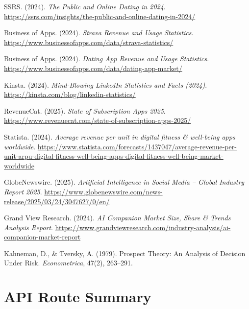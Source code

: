 \documentclass[11pt,a4paper]{article}
\begin{document}
\begin{enumerate}[label={[\arabic*]}, leftmargin=*, itemsep=2pt]
  \item SSRS. (2024). \textit{The Public and Online Dating in 2024}. \url{https://ssrs.com/insights/the-public-and-online-dating-in-2024/}

  \item Business of Apps. (2024). \textit{Strava Revenue and Usage Statistics}. \url{https://www.businessofapps.com/data/strava-statistics/}

  \item Business of Apps. (2024). \textit{Dating App Revenue and Usage Statistics}. \url{https://www.businessofapps.com/data/dating-app-market/}

  \item Kinsta. (2024). \textit{Mind-Blowing LinkedIn Statistics and Facts (2024)}. \url{https://kinsta.com/blog/linkedin-statistics/}

  \item RevenueCat. (2025). \textit{State of Subscription Apps 2025}. \url{https://www.revenuecat.com/state-of-subscription-apps-2025/}

  \item Statista. (2024). \textit{Average revenue per unit in digital fitness \& well-being apps worldwide}. \url{https://www.statista.com/forecasts/1437047/average-revenue-per-unit-arpu-digital-fitness-well-being-apps-digital-fitness-well-being-market-worldwide}

  \item GlobeNewswire. (2025). \textit{Artificial Intelligence in Social Media -- Global Industry Report 2025}. \url{https://www.globenewswire.com/news-release/2025/03/24/3047627/0/en/}

  \item Grand View Research. (2024). \textit{AI Companion Market Size, Share \& Trends Analysis Report}. \url{https://www.grandviewresearch.com/industry-analysis/ai-companion-market-report}

  \item Kahneman, D., \& Tversky, A. (1979). Prospect Theory: An Analysis of Decision Under Risk. \textit{Econometrica}, 47(2), 263--291.

\end{enumerate}

\newpage
\appendix
\section{API Route Summary}
\end{document}
